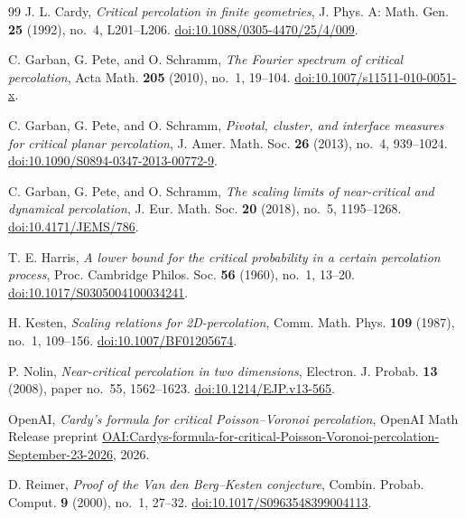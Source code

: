 \begin{thebibliography}{99}
J. L. Cardy,
\emph{Critical percolation in finite geometries},
J. Phys. A: Math. Gen. \textbf{25} (1992), no.~4, L201--L206.
\href{https://doi.org/10.1088/0305-4470/25/4/009}{doi:10.1088/0305-4470/25/4/009}.

C. Garban, G. Pete, and O. Schramm,
\emph{The Fourier spectrum of critical percolation},
Acta Math. \textbf{205} (2010), no.~1, 19--104.
\href{https://doi.org/10.1007/s11511-010-0051-x}{doi:10.1007/s11511-010-0051-x}.

C. Garban, G. Pete, and O. Schramm,
\emph{Pivotal, cluster, and interface measures for critical planar
percolation},
J. Amer. Math. Soc. \textbf{26} (2013), no.~4, 939--1024.
\href{https://doi.org/10.1090/S0894-0347-2013-00772-9}{doi:10.1090/S0894-0347-2013-00772-9}.

C. Garban, G. Pete, and O. Schramm,
\emph{The scaling limits of near-critical and dynamical percolation},
J. Eur. Math. Soc. \textbf{20} (2018), no.~5, 1195--1268.
\href{https://doi.org/10.4171/JEMS/786}{doi:10.4171/JEMS/786}.

T. E. Harris,
\emph{A lower bound for the critical probability in a certain
percolation process},
Proc. Cambridge Philos. Soc. \textbf{56} (1960), no.~1, 13--20.
\href{https://doi.org/10.1017/S0305004100034241}{doi:10.1017/S0305004100034241}.

H. Kesten,
\emph{Scaling relations for 2D-percolation},
Comm. Math. Phys. \textbf{109} (1987), no.~1, 109--156.
\href{https://doi.org/10.1007/BF01205674}{doi:10.1007/BF01205674}.

P. Nolin,
\emph{Near-critical percolation in two dimensions},
Electron. J. Probab. \textbf{13} (2008), paper no.~55, 1562--1623.
\href{https://doi.org/10.1214/EJP.v13-565}{doi:10.1214/EJP.v13-565}.

OpenAI,
\emph{Cardy's formula for critical Poisson--Voronoi percolation},
OpenAI Math Release preprint
\href{https://github.com/openai/math/blob/main/preprints/Cardys-formula-for-critical-Poisson-Voronoi-percolation-September-23-2026/paper.pdf}{OAI:Cardys-formula-for-critical-Poisson-Voronoi-percolation-September-23-2026},
2026.

D. Reimer,
\emph{Proof of the Van den Berg--Kesten conjecture},
Combin. Probab. Comput. \textbf{9} (2000), no.~1, 27--32.
\href{https://doi.org/10.1017/S0963548399004113}{doi:10.1017/S0963548399004113}.


\end{thebibliography}
